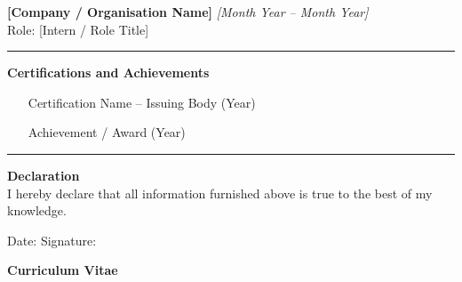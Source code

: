 \noindent\textbf{[Company / Organisation Name]} \hfill \textit{[Month Year -- Month Year]}\\
Role: [Intern / Role Title]\\
[Brief description of work done.]

\vspace{0.4cm}\hrule\vspace{0.4cm}

\noindent\textbf{Certifications and Achievements}
\begin{itemize}\setlength\itemsep{1pt}
  \item [Certification Name -- Issuing Body (Year)]
  \item [Achievement / Award (Year)]
\end{itemize}

\vspace{0.4cm}\hrule\vspace{0.4cm}

\noindent\textbf{Declaration}\\[3pt]
I hereby declare that all information furnished above is true to the best of
my knowledge.

\vspace{0.6cm}
\noindent Date: \submissiondate \hfill Signature: \underline{\hspace{4cm}}

\newpage
\thispagestyle{fancy}

\begin{center}
  {\Large\textbf{Curriculum Vitae}}
\end{center}

\vspace{0.3cm}

